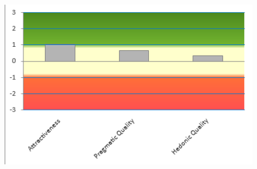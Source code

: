\documentclass{article}
\begin{document}
	\begin{figure}[h]
		\includegraphics[width=\linewidth]{./Screenshots/Attractiveness_Pragmatic_Hedonic_Quality.png}
		\label{fig:Attractiveness_Pragmatic_Hedonic_Quality}
	\end{figure}
	\par
	\newpage
	
	\printbibliography %
\end{document}
